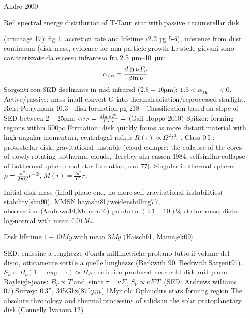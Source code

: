 \begin{workout}
Andre 2000 - 
\end{workout}

\begin{workout}
Ref: spectral energy distribution of T-Tauri star with passive circumstellar disk
\end{workout}

\begin{workout}
(armitage 17): fig 1, accretion rate and lifetime (2.2 pg 5-6), inference from dust continuum (disk mass, evidence for mm-particle growth
Le stelle giovani sono caratterizzate da eccesso infrarosso fra \SIrange{2.5}{10}{\micro\meter}:
\begin{equation}
\alpha_{IR}=\frac{d \ln{\nu F_{\nu}}}{d \ln{\nu}}
\end{equation}
Sorgenti con SED declinante in mid infrared ($2.5-10\si{\micro\meter}$): $1.5<\alpha_{IR}=<0$. Active/passive: mass infall convert G into thermalradiation/reprocessed starlight.
Refs: Perrymann 10.3 - disk formation pg 218 - 
Classification based on slope of SED between $2-25\si{\micro\meter}$: $\alpha_{IR}=\frac{d \ln{\nu F_{\nu}}}{d \ln{\nu}}=$ (Gail Hoppo 2010)
Spitzer: forming regions within 500pc
Formation: disk quickly forms as more distant material with high angular momentum, centrifugal radius $R(t)\propto\Omega^2 t^3$: . Class 0-I : protostellar disk, gravitational unstable (cloud collapse: the collapse of the cores of slowly rotating isothermal clouds, Terebey shu cassen 1984, selfsimilar collapse of isothermal spheres and star formation, shu 77). Singular isothermal sphere: $\rho=\frac{a^2}{2\pi G}r^{-2}$, $M(r)=\frac{2a^2}{G}r$.
\end{workout}

\begin{workout}

Initial disk mass
(infall phase end, no more self-gravitational instabilities) - stability(shu90), MMSN hayashi81/weidenshilling77, observations(Andrews10,Manara16) points to $(0.1-10)\%$ stellar mass, distro log-normal with mean $0.01M_*$.

{Disk lifetime}
$1-10My$ with mean $3My$ (Haisch01, Mamajek09)

\end{workout}

\begin{workout}
SED: emissine a lunghezze d'onda millimetriche probano tutto il volume del disco, otticamente sottile a quelle lunghezze (Beckwith 90, Beckwith Sargent91).
$S_{\nu}\propto B_{\nu}(1-\exp{-\tau})\approx B_{\nu}\tau$: emission produced near cold disk mid-plane.
Rayleigh-jeans: $B_{\nu}\propto T$ and, since $\tau=\kappa\Sigma$, $S_{\nu}\propto \kappa\Sigma T$.
(SED: Andrews williams 07)
Survey: 0.3'', 345Ghz(870$\micro m$) 1Myr old Ophiuchus stars forming region
The absolute chronology and thermal processing of solids in the solar protoplanetary disk (Connelly Ivanova 12)
\end{workout}

